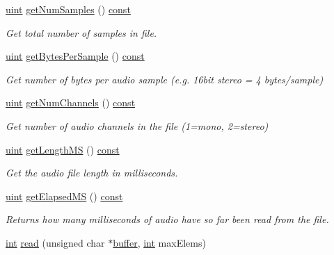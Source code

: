 \begin{DoxyCompactItemize}
\item 
\hyperlink{_s_t_types_8h_a91ad9478d81a7aaf2593e8d9c3d06a14}{uint} \hyperlink{class_wav_in_file_ab01225951aeceea51b03000cfb6461d3}{get\+Num\+Samples} () \hyperlink{getopt1_8c_a2c212835823e3c54a8ab6d95c652660e}{const} 
\begin{DoxyCompactList}\small\item\em Get total number of samples in file. \end{DoxyCompactList}\item 
\hyperlink{_s_t_types_8h_a91ad9478d81a7aaf2593e8d9c3d06a14}{uint} \hyperlink{class_wav_in_file_a2effb4d74d5461a43607e0d00c4a58d9}{get\+Bytes\+Per\+Sample} () \hyperlink{getopt1_8c_a2c212835823e3c54a8ab6d95c652660e}{const} 
\begin{DoxyCompactList}\small\item\em Get number of bytes per audio sample (e.\+g. 16bit stereo = 4 bytes/sample) \end{DoxyCompactList}\item 
\hyperlink{_s_t_types_8h_a91ad9478d81a7aaf2593e8d9c3d06a14}{uint} \hyperlink{class_wav_in_file_a03a0bb599a410043e686d727387450c5}{get\+Num\+Channels} () \hyperlink{getopt1_8c_a2c212835823e3c54a8ab6d95c652660e}{const} 
\begin{DoxyCompactList}\small\item\em Get number of audio channels in the file (1=mono, 2=stereo) \end{DoxyCompactList}\item 
\hyperlink{_s_t_types_8h_a91ad9478d81a7aaf2593e8d9c3d06a14}{uint} \hyperlink{class_wav_in_file_a6b99d6455b1db2e72af74b562bb8a3d4}{get\+Length\+MS} () \hyperlink{getopt1_8c_a2c212835823e3c54a8ab6d95c652660e}{const} 
\begin{DoxyCompactList}\small\item\em Get the audio file length in milliseconds. \end{DoxyCompactList}\item 
\hyperlink{_s_t_types_8h_a91ad9478d81a7aaf2593e8d9c3d06a14}{uint} \hyperlink{class_wav_in_file_a2998a9dab1800e11a199805ef6b5d5ae}{get\+Elapsed\+MS} () \hyperlink{getopt1_8c_a2c212835823e3c54a8ab6d95c652660e}{const} 
\begin{DoxyCompactList}\small\item\em Returns how many milliseconds of audio have so far been read from the file. \end{DoxyCompactList}\item 
\hyperlink{xmltok_8h_a5a0d4a5641ce434f1d23533f2b2e6653}{int} \hyperlink{class_wav_in_file_a7ec0db887e9dcb28fc7a1dcb1914efea}{read} (unsigned char $\ast$\hyperlink{structbuffer}{buffer}, \hyperlink{xmltok_8h_a5a0d4a5641ce434f1d23533f2b2e6653}{int} max\+Elems)

\end{DoxyCompactItemize}
